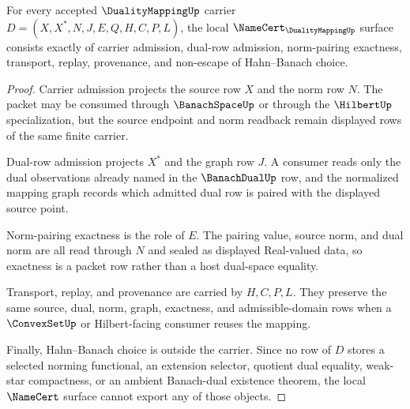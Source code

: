 \begin{theorem}
\label{thm:duality-mapping-namecert-obligations}
For every accepted $\DualityMappingUp$ carrier $D=(X,X^\ast,N,J,E,Q,H,C,P,L)$, the local $\NameCert_{\DualityMappingUp}$ surface consists exactly of carrier admission, dual-row admission, norm-pairing exactness, transport, replay, provenance, and non-escape of Hahn--Banach choice.
\end{theorem}
\begin{proof}
Carrier admission projects the source row $X$ and the norm row $N$. The packet may be consumed through $\BanachSpaceUp$ or through the $\HilbertUp$ specialization, but the source endpoint and norm readback remain displayed rows of the same finite carrier.

Dual-row admission projects $X^\ast$ and the graph row $J$. A consumer reads only the dual observations already named in the $\BanachDualUp$ row, and the normalized mapping graph records which admitted dual row is paired with the displayed source point.

Norm-pairing exactness is the role of $E$. The pairing value, source norm, and dual norm are all read through $N$ and sealed as displayed Real-valued data, so exactness is a packet row rather than a host dual-space equality.

Transport, replay, and provenance are carried by $H,C,P,L$. They preserve the same source, dual, norm, graph, exactness, and admissible-domain rows when a $\ConvexSetUp$ or Hilbert-facing consumer reuses the mapping.

Finally, Hahn--Banach choice is outside the carrier. Since no row of $D$ stores a selected norming functional, an extension selector, quotient dual equality, weak-star compactness, or an ambient Banach-dual existence theorem, the local $\NameCert$ surface cannot export any of those objects.
\end{proof}



